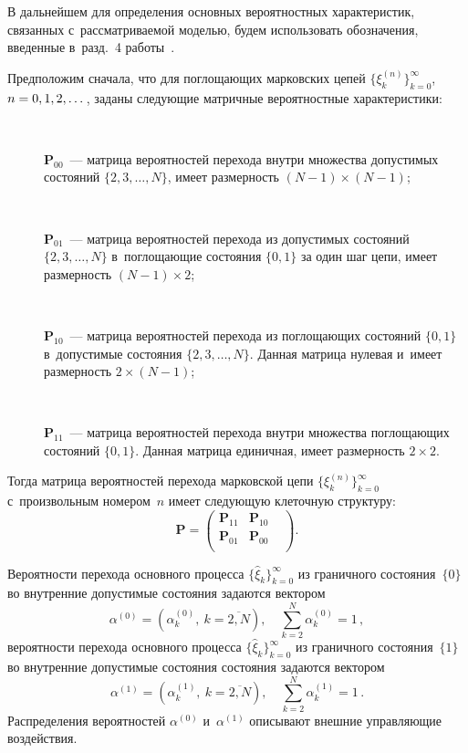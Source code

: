 \begin{multicols}{2}
В дальнейшем для определения основных вероятностных характеристик, связанных 
с~рассматриваемой моделью, будем использовать обозначения, введенные в~разд.~4 
работы~\cite{A5}.

Предположим сначала, что для поглощающих марковских цепей $\{ \xi_{k}^{(n)} \}_{k=0}^{\infty}$, $n\hm=0,1,2,\dots$, заданы сле\-ду\-ющие мат\-рич\-ные 
вероятностные характеристики:
\begin{description}
\item[\,]
$\textbf{P}_{00}$~--- матрица вероятностей перехода внут\-ри множества допустимых
состояний $\lbrace 2,3,\ldots ,N\rbrace $, имеет раз\-мер\-ность $(N-1)\times (N-1)$;
\item[\,]
$\textbf{P}_{01}$~--- матрица вероятностей перехода из допустимых состояний $\lbrace 2,3,\ldots ,N\rbrace $ в~поглощающие со\-сто\-яния 
$\lbrace 0,1\rbrace $ за один шаг цепи, имеет раз\-мер\-ность $(N-1)\times 2$;
\item[\,]
$\textbf{P}_{10}$~--- матрица вероятностей перехода из по\-гло\-ща\-ющих состояний 
$\lbrace 0,1\rbrace $ в~допустимые со\-сто\-яния $\lbrace 2,3,\ldots,N\rbrace $. 
Данная мат\-ри\-ца нулевая и~имеет раз\-мер\-ность $2\times (N-1)$;
\item[\,]
$\textbf{P}_{11}$~--- матрица вероятностей перехода внутри множества поглощающих
состояний $\lbrace 0,1\rbrace $. Данная матрица единичная, имеет размерность $2\times 2$.
\end{description}

Тогда матрица вероятностей перехода марковской цепи $\{ \xi _{k}^{(n)} 
\}_{k=0}^{\infty}$ с~произвольным номером~$n$ имеет
сле\-ду\-ющую клеточную структуру:
 $$
 \mathbf{P}=\begin{pmatrix}
\textbf{P}_{11} & \textbf{P}_{10} & \\
\textbf{P}_{01} & \textbf{P}_{00} & \\
\end{pmatrix}.
$$

Вероятности перехода основного процесса 
$\{\widehat{\xi}_k\}_{k=0}^{\infty}$ из граничного состояния~$\{0\}$ 
во внут\-рен\-ние допустимые со\-сто\-яния задаются вектором 
$$
\alpha^{(0)}=\left(\alpha_k^{(0)},\ k=\overline{2, N}\right),\quad
\sum\limits_{k=2}^N\alpha_k^{(0)}=1\,,
$$
 вероятности перехода основного процесса 
$\{\widehat{\xi}_k\}_{k=0}^{\infty}$ из граничного со\-сто\-яния~$\{1\}$ 
во внут\-рен\-ние допустимые со\-сто\-яния состояния задаются вектором 
$$
\alpha^{(1)}=\left(\alpha_k^{(1)},\ k=\overline{2,N}\right),\quad
\sum\limits_{k=2}^N\alpha_k^{(1)}=1\,.
$$
 Распределения вероятностей $\alpha^{(0)}$ 
и~$\alpha^{(1)}$ описывают внеш\-ние управ\-ля\-ющие воздействия.


\end{multicols}
